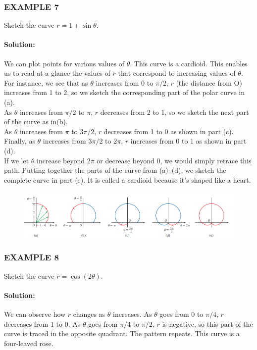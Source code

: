 \documentclass{article}
\begin{document}
\subsubsection*{EXAMPLE 7}
Sketch the curve $r=1+\sin\theta$.

\paragraph{Solution:} We can plot points for various values of $\theta$. This curve is a cardioid.
 This enables us to read at a glance the values of $r$ that correspond to increasing values of $\theta$. For instance, we see that as $\theta$ increases from 0 to $\pi/2$, $r$ (the distance from O) increases from 1 to 2, so we sketch the corresponding part of the polar curve in (a). 
 \\As $\theta$ increases from $\pi/2$ to $\pi$, $r$ decreases from 2 to 1, so we sketch the next part of the curve as in(b). 
 \\As $\theta$ increases from $\pi$ to $3\pi/2$, $r$ decreases from 1 to 0 as shown in part (c). 
 \\Finally, as $\theta$ increases from $3\pi/2$ to $2\pi$, $r$ increases from 0 to 1 as shown in part (d). 
 \\If we let $\theta$ increase beyond $2\pi$ or decrease beyond 0, we would simply retrace this path. Putting together the parts of the curve from (a)--(d), we sketch the complete curve in part (e). It is called a cardioid because it’s shaped like a heart.

\begin{figure}[htbp]
    \centering
    \includegraphics[width=1\textwidth]{graph38.png}
\end{figure}
\subsubsection*{EXAMPLE 8}
Sketch the curve $r=\cos(2\theta)$.

\paragraph{Solution:} We can observe how $r$ changes as $\theta$ increases. As $\theta$ goes from $0$ to $\pi/4$, $r$ decreases from $1$ to $0$. As $\theta$ goes from $\pi/4$ to $\pi/2$, $r$ is negative, so this part of the curve is traced in the opposite quadrant. The pattern repeats. This curve is a four-leaved rose.
\end{document}
